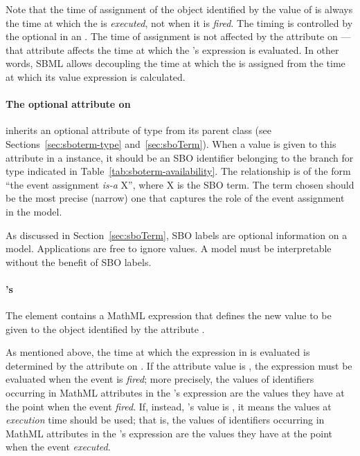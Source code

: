 Note that the time of assignment of the object identified by the
value of  is always the time at which the \Event
is \emph{executed}, not when it is \emph{fired}.  The timing is
controlled by the optional \Delay in an \Event.  The time of
assignment is not affected by the 
attribute on \Event---that attribute affects the time at which the
\EventAssignment's  expression is evaluated.  In other
words, SBML allows decoupling the time at which the
 is assigned from the time at which its value
expression is calculated.


\paragraph{The optional  attribute on }
\label{sec:eventassignment-sboterm}

\EventAssignment   inherits an optional 
attribute of type  from its parent
class \SBase (see Sections~\ref{sec:sboterm-type}
and~\ref{sec:sboTerm}).  When a value is given to this
attribute in a  \EventAssignment  instance, it should be an
SBO identifier belonging to the branch for type  \EventAssignment 
indicated in Table~\ref{tab:sboterm-availability}.  The relationship is
of the form ``the event assignment \emph{is-a} X'', where X is
the SBO term.  The term chosen should be the most precise (narrow)
one that captures the role of the event assignment  in the model.

As discussed in Section~\ref{sec:sboTerm}, SBO labels are optional
information on a model.  Applications are free to ignore
 values.  A model must be interpretable without the
benefit of SBO labels.


\paragraph{'s }

The  element contains a MathML expression that defines
the new value to be given to the object identified by the
\EventAssignment attribute .

As mentioned above, the time at which the expression in
 is evaluated is determined by the attribute
 on \Event.  If the attribute
value is , the expression must be evaluated when the
event is \emph{fired}; more precisely, the values of identifiers
occurring in MathML  attributes in the
\EventAssignment's  expression are the values they
have at the point when the event \emph{fired}.  If, instead,
's value is , it means
the values at \emph{execution} time should be used; that is, the
values of identifiers occurring in MathML  attributes in
the \EventAssignment's  expression are the values they
have at the point when the event \emph{executed}.


